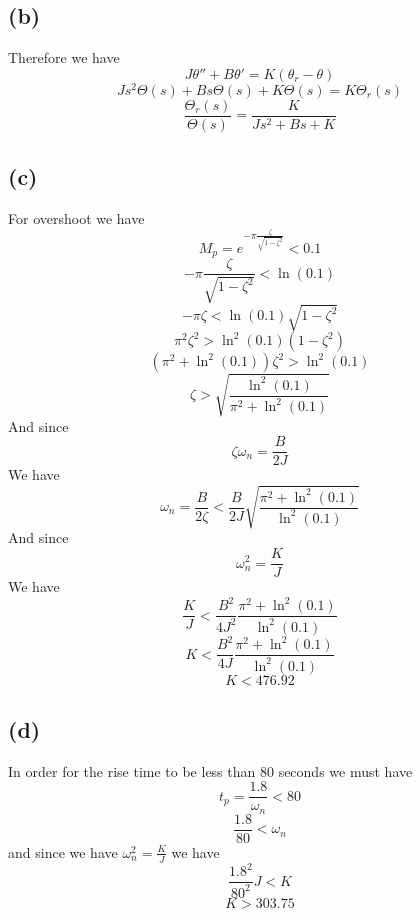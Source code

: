 \documentclass[12pt]{article}
\begin{document}
\subsection*{(b)}
Therefore we have
$$J\theta''+B\theta'=K(\theta_r-\theta)$$
$$Js^2\Theta(s)+Bs\Theta(s)+K\Theta(s)=K\Theta_r(s)$$
$$\frac{\Theta_r(s)}{\Theta(s)}=\boxed{\frac{K}{Js^2+Bs+K}}$$
\subsection*{(c)}
For overshoot we have
$$M_p=e^{-\pi\frac{\zeta}{\sqrt{1-\zeta^2}}}<0.1$$
$$-\pi\frac{\zeta}{\sqrt{1-\zeta^2}}<\ln(0.1)$$
$$-\pi\zeta<\ln(0.1)\sqrt{1-\zeta^2}$$
$$\pi^2\zeta^2>\ln^2(0.1)(1-\zeta^2)$$
$$(\pi^2+\ln^2(0.1))\zeta^2>\ln^2(0.1)$$
$$\zeta>\sqrt{\frac{\ln^2(0.1)}{\pi^2+\ln^2(0.1)}}$$
And since 
$$\zeta\omega_n=\frac{B}{2J}$$
We have
$$\omega_n=\frac{B}{2\zeta}<\frac{B}{2J}\sqrt{\frac{\pi^2+\ln^2(0.1)}{\ln^2(0.1)}}$$
And since
$$\omega_n^2=\frac{K}{J}$$
We have
$$\frac{K}{J}<\frac{B^2}{4J^2}\frac{\pi^2+\ln^2(0.1)}{\ln^2(0.1)}$$
$$K<\frac{B^2}{4J}\frac{\pi^2+\ln^2(0.1)}{\ln^2(0.1)}$$
$$K<476.92$$
\subsection*{(d)}
In order for the rise time to be less than 80 seconds we must have
$$t_p=\frac{1.8}{\omega_n}<80$$
$$\frac{1.8}{80}<\omega_n$$
and since we have $\omega_n^2=\frac{K}{J}$ we have
$$\frac{1.8^2}{80^2}J<K$$
$$K>\boxed{303.75}$$
\end{document}
